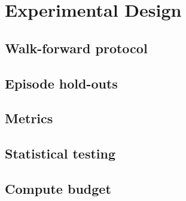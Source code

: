 \section{Experimental Design}\label{sec:eval}

\subsection{Walk-forward protocol}\label{sec:eval-walkforward}

\subsection{Episode hold-outs}\label{sec:eval-holdouts}

\subsection{Metrics}\label{sec:eval-metrics}

\subsection{Statistical testing}\label{sec:eval-stats}

\subsection{Compute budget}\label{sec:eval-compute}
